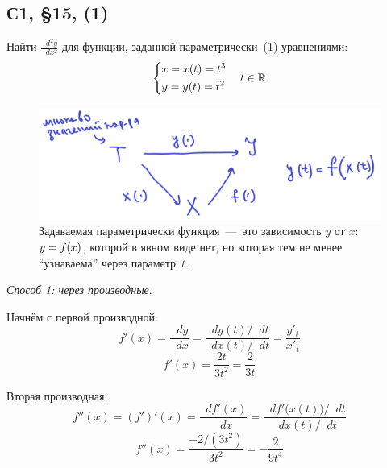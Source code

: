 \documentclass[a4paper,12pt]{article}
\newcommand{\diff}{\mathop{}\!d\!}
\begin{document}
  
  \subsection{С1, \S 15, (1)}\label{sec:1-15-14(1)}

  Найти $\frac{\diff^2 y}{\diff x^2}$ для функции, заданной параметрически~(\ref{fig:parametric-as-function-chain}) уравнениями:
  \[
    \left\{
      \begin{aligned}
        &x = x(t) = t^3\\
        &y = y(t) = t^2
      \end{aligned}
    \right.\quad t \in \operatorname{\mathbb R}
  \]
  
  \begin{solution}
    \begin{figure}
        \centering
        
        \includegraphics[width=0.8\linewidth]{images/parametric-as-function-chain}
        
        \caption{Задаваемая параметрически функция~---~это зависимость $y$ от $x$: $y \hm= f(x)$, которой в явном виде нет, но которая тем не менее ``узнаваема'' через параметр~$t$.}
        \label{fig:parametric-as-function-chain}
    \end{figure}
    
    \mbox{}\par\noindent
    \emph{Способ 1: через производные}.

    Начнём с первой производной:
    \[
      f'(x) = \frac{\diff y}{\diff x}
        = \frac{\diff y(t) / \!\diff t}{\diff x(t) / \!\diff t}
        = \frac{y'_t}{x'_t}
    \]
    \[
      f'(x) = \frac{2 t}{3 t^2} = \frac{2}{3 t}
    \]

    Вторая производная:
    \[
      f''(x) = (f')'(x) = \frac{\diff f'(x)}{\diff x}
        = \frac{\diff f'\bigl(x(t)\bigr) / \!\diff t}{\diff x(t) / \!\diff t}
    \]
    \[
      f''(x) = \frac{-2/(3t^2)}{3 t^2} = -\frac{2}{9 t^4}
    \]


\end{solution}
\end{document}
